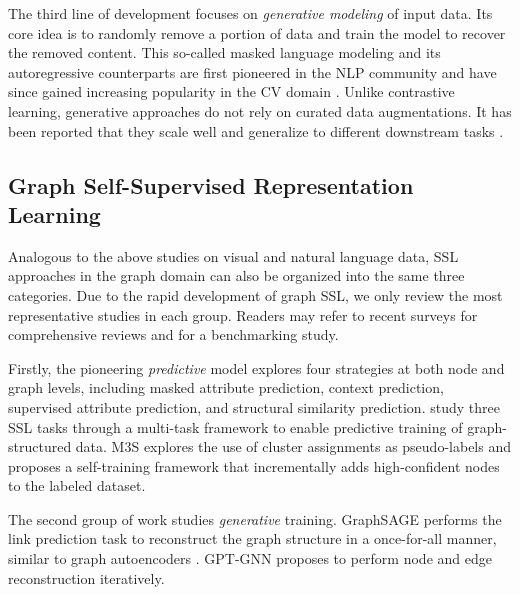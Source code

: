 The third line of development focuses on \emph{generative modeling} of input data.
Its core idea is to randomly remove a portion of data and train the model to recover the removed content.
This so-called masked language modeling and its autoregressive counterparts are first pioneered in the NLP community \cite{Bengio:2003vh,Peters:2018jz,Devlin:2019uk,Liu:2019dd,Lan:2020tt,Radford:2018im,Radford:2019lm,Brown:2020tp} and have since gained increasing popularity in the CV domain \cite{Dosovitskiy:2021uc,He:2022hx,Wei:2021ev}.
Unlike contrastive learning, generative approaches do not rely on curated data augmentations.
It has been reported that they scale well and generalize to different downstream tasks \cite{Devlin:2019uk,Brown:2020tp,He:2022hx}.

\subsection{Graph Self-Supervised Representation Learning}
Analogous to the above studies on visual and natural language data, SSL approaches in the graph domain can also be organized into the same three categories.
Due to the rapid development of graph SSL, we only review the most representative studies in each group.
Readers may refer to recent surveys \cite{Wu:2022wg,Xie:2022uv,Liu:2022wc} for comprehensive reviews and \citet{Zhu:2021tu} for a benchmarking study.

Firstly, the pioneering \emph{predictive} model \citet{Hu:2020uz} explores four strategies at both node and graph levels, including masked attribute prediction, context prediction, supervised attribute prediction, and structural similarity prediction.
\citet{You:2020um} study three SSL tasks through a multi-task framework to enable predictive training of graph-structured data.
M3S \cite{Sun:2020wx} explores the use of cluster assignments \cite{Caron:2018ba} as pseudo-labels and proposes a self-training framework that incrementally adds high-confident nodes to the labeled dataset.

The second group of work studies \emph{generative} training.
GraphSAGE \cite{Hamilton:2017tp} performs the link prediction task to reconstruct the graph structure in a once-for-all manner, similar to graph autoencoders \cite{Kipf:2016ul}.
GPT-GNN \cite{Hu:2020vh} proposes to perform node and edge reconstruction iteratively.

